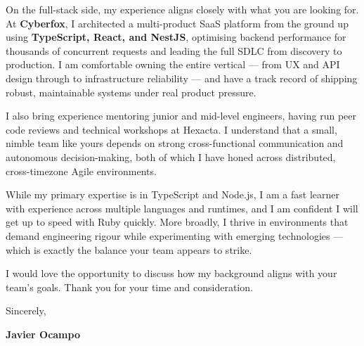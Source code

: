 \documentclass[10pt, letterpaper]{article}
\begin{document}
On the full-stack side, my experience aligns closely with what you are looking for. At \textbf{Cyberfox}, I architected a multi-product SaaS platform from the ground up using \textbf{TypeScript, React, and NestJS}, optimising backend performance for thousands of concurrent requests and leading the full SDLC from discovery to production. I am comfortable owning the entire vertical — from UX and API design through to infrastructure reliability — and have a track record of shipping robust, maintainable systems under real product pressure.

I also bring experience mentoring junior and mid-level engineers, having run peer code reviews and technical workshops at Hexacta. I understand that a small, nimble team like yours depends on strong cross-functional communication and autonomous decision-making, both of which I have honed across distributed, cross-timezone Agile environments.

While my primary expertise is in TypeScript and Node.js, I am a fast learner with experience across multiple languages and runtimes, and I am confident I will get up to speed with Ruby quickly. More broadly, I thrive in environments that demand engineering rigour while experimenting with emerging technologies — which is exactly the balance your team appears to strike.

I would love the opportunity to discuss how my background aligns with your team's goals. Thank you for your time and consideration.

\vspace{0.5cm}

\noindent Sincerely,

\vspace{0.3cm}

\noindent \textbf{Javier Ocampo}
\end{document}
